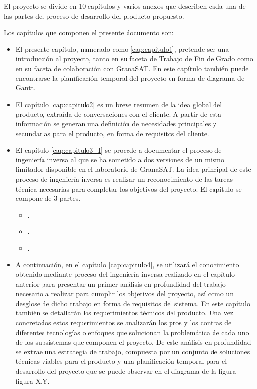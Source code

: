 El proyecto se divide en 10 capítulos y varios anexos que describen cada una de las partes del proceso de desarrollo del producto propuesto.

Los capítulos que componen el presente documento son:

\begin{itemize}
    \item El presente capítulo, numerado como \ref{cap:capitulo1}, pretende ser una introducción al proyecto, tanto en su faceta de Trabajo de Fin de Grado como en su faceta de colaboración con GranaSAT. En este capítulo también puede encontrarse la planificación temporal del proyecto en forma de diagrama de Gantt.

    \item El capítulo \ref{cap:capitulo2} es un breve resumen de la idea global del producto, extraída de conversaciones con el cliente. A partir de esta información se generan una definición de necesidades principales y secundarias para el producto, en forma de requisitos del cliente.

    \item El capítulo \ref{cap:capitulo3_I} se procede a documentar el proceso de ingeniería inversa al que se ha sometido a dos versiones de un mismo limitador disponible en el laboratorio de GranaSAT. La idea principal de este proceso de ingeniería inversa es realizar un reconocimiento de las tareas técnica necesarias para completar los objetivos del proyecto. El capítulo se compone de 3 partes.
    \begin{itemize}
		\item {}.
		\item {}.
		\item {}.
    \end{itemize}

    \item A continuación, en el capítulo \ref{cap:capitulo4}, se utilizará el conocimiento obtenido mediante proceso del ingeniería inversa realizado en el capítulo anterior para presentar un primer análisis en profundidad del trabajo necesario a realizar para cumplir los objetivos del proyecto, así como un desglose de dicho trabajo en forma de requisitos del sistema. En este capítulo también se detallarán los requerimientos técnicos del producto. Una vez concretados estos requerimientos se analizarán los pros y los contras de diferentes tecnologías o enfoques que solucionan la problemática de cada uno de los subsistemas que componen el proyecto. De este análisis en profundidad se extrae una estrategia de trabajo, compuesta por un conjunto de soluciones técnicas viables para el producto y una planificación temporal para el desarrollo del proyecto que se puede observar en el diagrama de la figura figura X.Y.


\end{itemize}
